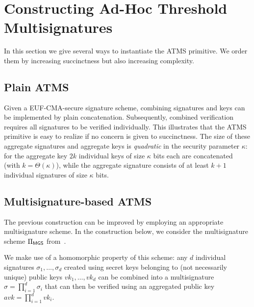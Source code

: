 \section{Constructing Ad-Hoc Threshold Multisignatures}
\label{sec:auth}


In this section we give several ways to instantiate the ATMS primitive.  We order
them by increasing succinctness but also increasing complexity.

\subsection{Plain ATMS}

Given a EUF-CMA-secure signature scheme, combining signatures and keys can be
implemented  by plain concatenation. Subsequently, combined verification
requires all signatures to be verified individually. This illustrates that the
ATMS primitive is easy to realize if no concern is given to succinctness.
%
The size of these aggregate signatures and aggregate keys is \emph{quadratic} in
the security parameter $\kappa$: for the aggregate key $2k$ individual keys of size
$\kappa$ bits each are concatenated (with $k=\Theta(\kappa)$), while the aggregate signature consists of
at least $k+1$ individual signatures of size $\kappa$ bits.

\subsection{Multisignature-based ATMS}

The previous construction can be improved by
employing an appropriate multisignature
scheme.
In the construction below, we consider the multisignature scheme
$\Pi_{\textsf{MGS}}$
from~\cite{PKC:Boldyreva03}.

We make use of a homomorphic property of
this scheme:
any $d$ individual signatures $\sigma_1,\ldots,\sigma_d$ created using
secret keys belonging to (not necessarily unique) public keys $vk_1,\ldots,vk_d$
can be combined into a multisignature $\sigma=\prod_{i=1}^{d}\sigma_i$ that can
then be verified using an aggregated public key $avk=\prod_{i=1}^{d}vk_i$.


